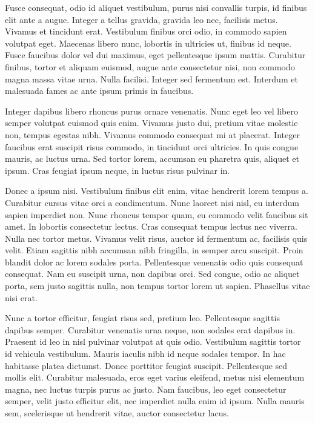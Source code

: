 \documentclass[twoside]{article}
\begin{document}
\begin{multicols}{2}
  Fusce consequat, odio id aliquet vestibulum, purus nisi convallis turpis, id finibus elit ante a augue. Integer a tellus gravida, gravida leo nec, facilisis metus. Vivamus et tincidunt erat. Vestibulum finibus orci odio, in commodo sapien volutpat eget. Maecenas libero nunc, lobortis in ultricies ut, finibus id neque. Fusce faucibus dolor vel dui maximus, eget pellentesque ipsum mattis. Curabitur finibus, tortor et aliquam euismod, augue ante consectetur nisi, non commodo magna massa vitae urna. Nulla facilisi. Integer sed fermentum est. Interdum et malesuada fames ac ante ipsum primis in faucibus.

  Integer dapibus libero rhoncus purus ornare venenatis. Nunc eget leo vel libero semper volutpat euismod quis enim. Vivamus justo dui, pretium vitae molestie non, tempus egestas nibh. Vivamus commodo consequat mi at placerat. Integer faucibus erat suscipit risus commodo, in tincidunt orci ultricies. In quis congue mauris, ac luctus urna. Sed tortor lorem, accumsan eu pharetra quis, aliquet et ipsum. Cras feugiat ipsum neque, in luctus risus pulvinar in.

  Donec a ipsum nisi. Vestibulum finibus elit enim, vitae hendrerit lorem tempus a. Curabitur cursus vitae orci a condimentum. Nunc laoreet nisi nisl, eu interdum sapien imperdiet non. Nunc rhoncus tempor quam, eu commodo velit faucibus sit amet. In lobortis consectetur lectus. Cras consequat tempus lectus nec viverra. Nulla nec tortor metus. Vivamus velit risus, auctor id fermentum ac, facilisis quis velit. Etiam sagittis nibh accumsan nibh fringilla, in semper arcu suscipit. Proin blandit dolor ac lorem sodales porta. Pellentesque venenatis odio quis consequat consequat. Nam eu suscipit urna, non dapibus orci. Sed congue, odio ac aliquet porta, sem justo sagittis nulla, non tempus tortor lorem ut sapien. Phasellus vitae nisi erat.

  Nunc a tortor efficitur, feugiat risus sed, pretium leo. Pellentesque sagittis dapibus semper. Curabitur venenatis urna neque, non sodales erat dapibus in. Praesent id leo in nisl pulvinar volutpat at quis odio. Vestibulum sagittis tortor id vehicula vestibulum. Mauris iaculis nibh id neque sodales tempor. In hac habitasse platea dictumst. Donec porttitor feugiat suscipit. Pellentesque sed mollis elit. Curabitur malesuada, eros eget varius eleifend, metus nisi elementum magna, nec luctus turpis purus ac justo. Nam faucibus, leo eget consectetur semper, velit justo efficitur elit, nec imperdiet nulla enim id ipsum. Nulla mauris sem, scelerisque ut hendrerit vitae, auctor consectetur lacus.


\end{multicols}
\end{document}
